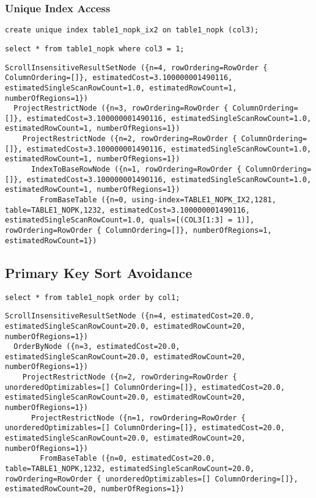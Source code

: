 \subsubsection{Unique Index Access}

\begin{verbatim}
create unique index table1_nopk_ix2 on table1_nopk (col3);
\end{verbatim}

\begin{verbatim}
select * from table1_nopk where col3 = 1;
\end{verbatim}

\begin{verbatim}
ScrollInsensitiveResultSetNode ({n=4, rowOrdering=RowOrder { ColumnOrdering=[]}, estimatedCost=3.100000001490116, estimatedSingleScanRowCount=1.0, estimatedRowCount=1, numberOfRegions=1})
  ProjectRestrictNode ({n=3, rowOrdering=RowOrder { ColumnOrdering=[]}, estimatedCost=3.100000001490116, estimatedSingleScanRowCount=1.0, estimatedRowCount=1, numberOfRegions=1})
    ProjectRestrictNode ({n=2, rowOrdering=RowOrder { ColumnOrdering=[]}, estimatedCost=3.100000001490116, estimatedSingleScanRowCount=1.0, estimatedRowCount=1, numberOfRegions=1})
      IndexToBaseRowNode ({n=1, rowOrdering=RowOrder { ColumnOrdering=[]}, estimatedCost=3.100000001490116, estimatedSingleScanRowCount=1.0, estimatedRowCount=1, numberOfRegions=1})
        FromBaseTable ({n=0, using-index=TABLE1_NOPK_IX2,1281, table=TABLE1_NOPK,1232, estimatedCost=3.100000001490116, estimatedSingleScanRowCount=1.0, quals=[(COL3[1:3] = 1)], rowOrdering=RowOrder { ColumnOrdering=[]}, numberOfRegions=1, estimatedRowCount=1})
\end{verbatim}

\subsection{Primary Key Sort Avoidance}

\begin{verbatim}
select * from table1_nopk order by col1;
\end{verbatim}

\begin{verbatim}
ScrollInsensitiveResultSetNode ({n=4, estimatedCost=20.0, estimatedSingleScanRowCount=20.0, estimatedRowCount=20, numberOfRegions=1})
  OrderByNode ({n=3, estimatedCost=20.0, estimatedSingleScanRowCount=20.0, estimatedRowCount=20, numberOfRegions=1})
    ProjectRestrictNode ({n=2, rowOrdering=RowOrder { unorderedOptimizables=[] ColumnOrdering=[]}, estimatedCost=20.0, estimatedSingleScanRowCount=20.0, estimatedRowCount=20, numberOfRegions=1})
      ProjectRestrictNode ({n=1, rowOrdering=RowOrder { unorderedOptimizables=[] ColumnOrdering=[]}, estimatedCost=20.0, estimatedSingleScanRowCount=20.0, estimatedRowCount=20, numberOfRegions=1})
        FromBaseTable ({n=0, estimatedCost=20.0, table=TABLE1_NOPK,1232, estimatedSingleScanRowCount=20.0, rowOrdering=RowOrder { unorderedOptimizables=[] ColumnOrdering=[]}, estimatedRowCount=20, numberOfRegions=1})
\end{verbatim}
   
